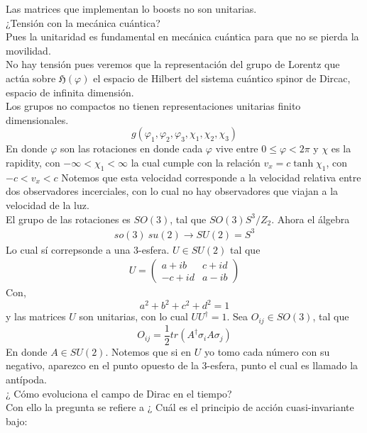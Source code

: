 \documentclass[../main.tex]{subfiles}
\begin{document}
Las matrices que implementan lo boosts no son unitarias. \\
¿Tensión con la mecánica cuántica? \\
Pues la unitaridad es fundamental en mecánica cuántica para que no se pierda la movilidad. \\
No hay tensión pues veremos que la representación del grupo de Lorentz que actúa sobre $\mathfrak{H}(\varphi)$ el espacio de Hilbert del sistema cuántico  spinor de Dircac, espacio de infinita dimensión. \\
Los grupos no compactos no tienen representaciones unitarias finito dimensionales. 
\begin{equation}
  g(\varphi_1,\varphi_2,\varphi_3,\chi_1,\chi_2,\chi_3)
 \end{equation}
 En donde $\varphi$ son las rotaciones en donde cada $\varphi$ vive entre $0\leq \varphi <2\pi$ y $\chi$  es la rapidity, con $-\infty < \chi_1 <\infty $ la cual cumple con la relación $v_x=c\tanh \chi_1$, con $-c<v_x<c$ Notemos que esta velocidad corresponde a la velocidad relativa entre dos observadores incerciales, con lo cual no hay observadores que viajan a la velocidad de la luz. \\
El grupo de las rotaciones es $SO(3)$, tal que $SO(3)S^3/Z_2$. Ahora el álgebra 
\begin{align*}
  so(3)~ su(2) \rightarrow SU(2) = S^3
\end{align*}
Lo cual sí correpsonde a una 3-esfera. $U\in SU(2)$ tal que
\begin{align*}
  U = \begin{pmatrix}
    a+ib & c+id \\ -c+id & a-ib
  \end{pmatrix}
\end{align*}
Con,
\begin{equation*}
  a^2+b^2+c^2+d^2 = 1
\end{equation*}
y las matrices $U$ son unitarias, con lo cual $UU^\dagger=1$. Sea $O_{ij}\in SO(3)$, tal que 
\begin{equation*}
  O_{ij} = \frac{1}{2}tr \left( A^\dagger \sigma_i A \sigma_j \right)
\end{equation*}
En donde $A\in SU(2)$. Notemos que si en $U$ yo tomo cada número con su negativo, aparezco en el punto opuesto de la 3-esfera, punto el cual es llamado la antípoda. \\
¿ Cómo evoluciona el campo de Dirac en el tiempo?\\
Con ello la pregunta se refiere a ¿ Cuál es el principio de acción cuasi-invariante bajo: 
\end{document}
